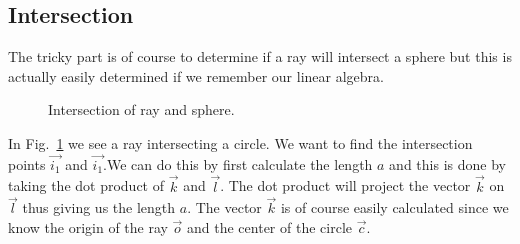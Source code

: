 \documentclass[a4paper,11pt]{article}
\begin{document}
\subsection*{Intersection}

The tricky part is of course to determine if a ray will intersect a
sphere but this is actually easily determined if we remember our
linear algebra.

\begin{figure}[h!]
\begin{center}
\caption{Intersection of ray and sphere.}
\label{fig:intersection}
\end{center}
\end{figure}

In Fig.~\ref{fig:intersection} we see a ray intersecting a circle. We
want to find the intersection points $\vec{i_1}$ and $\vec{i_1}$.We
can do this by first calculate the length $a$ and this is done by taking
the dot product of $\vec{k}$ and $\vec{l}$. The dot product will
project the vector $\vec{k}$ on $\vec{l}$ thus giving us the
length $a$. The vector $\vec{k}$ is of course easily calculated since we
know the origin of the ray $\vec{o}$ and the center of the circle
$\vec{c}$.
\end{document}
